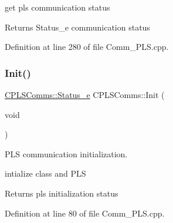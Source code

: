 get pls communication status 

\begin{DoxyReturn}{Returns}
Status\+\_\+e communication status 
\end{DoxyReturn}


Definition at line 280 of file Comm\+\_\+\+P\+L\+S.\+cpp.

\mbox{\label{class_c_p_l_s_comms_ae7f8d87ea15de35a120d65a7a8bbbb76}} 
\subsubsection{\texorpdfstring{Init()}{Init()}}
{\footnotesize\ttfamily \mbox{\hyperlink{class_c_p_l_s_comms_a765bc36363f75f4faf4fd2b41d440159}{C\+P\+L\+S\+Comms\+::\+Status\+\_\+e}} C\+P\+L\+S\+Comms\+::\+Init (\begin{DoxyParamCaption}\item[{void}]{ }\end{DoxyParamCaption})}



P\+LS communication initialization. 

intialize class and P\+LS \begin{DoxyReturn}{Returns}
pls initialization status 
\end{DoxyReturn}


Definition at line 80 of file Comm\+\_\+\+P\+L\+S.\+cpp.

